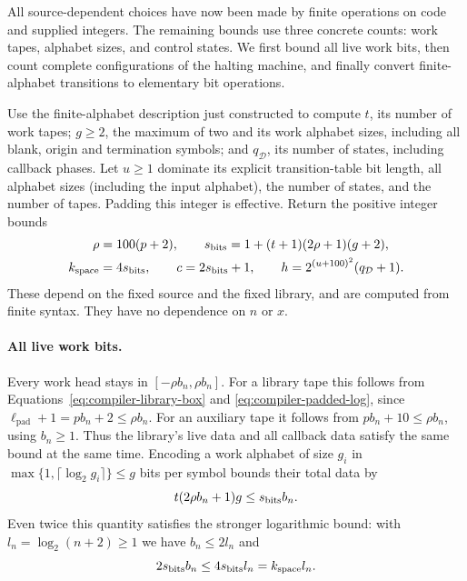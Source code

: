 \documentclass[11pt]{article}
\numberwithin{equation}{section}
\theoremstyle{definition}
\theoremstyle{remark}
\begin{document}
All source-dependent choices have now been made by finite operations on code and supplied integers. The remaining bounds use three concrete counts: work tapes, alphabet sizes, and control states. We first bound all live work bits, then count complete configurations of the halting machine, and finally convert finite-alphabet transitions to elementary bit operations.

Use the finite-alphabet description just constructed to compute $t$, its
number of work tapes; $g\ge2$, the maximum of two and its work alphabet
sizes, including all blank, origin and termination symbols; and $q_{\mathcal{D}}$,
its number of states, including callback phases.  Let $u\ge1$ dominate
its explicit transition-table bit length, all alphabet sizes (including
the input alphabet), the number of states, and the number of tapes.
Padding this integer is effective.  Return the positive integer bounds
\begin{equation}\label{eq:compiler-output-bounds}
 \begin{split}
 \rho&=100({p}+2),\qquad
 {s_{\rm bits}}=1+(t+1)(2\rho+1)(g+2),\\
 {k_{\rm space}}&=4{s_{\rm bits}},\qquad c=2{s_{\rm bits}}+1,\qquad
 {h}=2^{(u+100)^2}(q_{\mathcal{D}}+1).
 \end{split}
\end{equation}
These depend on the fixed source and the fixed library, and are computed
from finite syntax.  They have no dependence on $n$ or $x$.

\paragraph{All live work bits.}
Every work head stays in
$[-\rho {b}_n,\rho {b}_n]$.  For a library tape this follows from
Equations~\eqref{eq:compiler-library-box} and
\eqref{eq:compiler-padded-log}, since
$\ell_{\mathrm{pad}}+1={p}{b}_n+2\le\rho {b}_n$.
For an auxiliary tape it follows from
${p}{b}_n+10\le\rho {b}_n$, using ${b}_n\ge1$.
Thus the library's live data and all callback data satisfy the same
bound at the same time.  Encoding a work alphabet of size $g_i$ in
$\max\{1,\lceil\log_2 g_i\rceil\}\le g$ bits per symbol bounds
their total data by
\begin{equation}\label{eq:compiler-space-bound}
 t(2\rho {b}_n+1)g\le {s_{\rm bits}}{b}_n.
\end{equation}
Even twice this quantity satisfies the stronger logarithmic bound: with
${l}_n=\log_2(n+2)\ge1$ we have ${b}_n\le2{l}_n$ and
\[
 2{s_{\rm bits}}{b}_n\le4{s_{\rm bits}}{l}_n={k_{\rm space}} {l}_n.
\]
\end{document}
